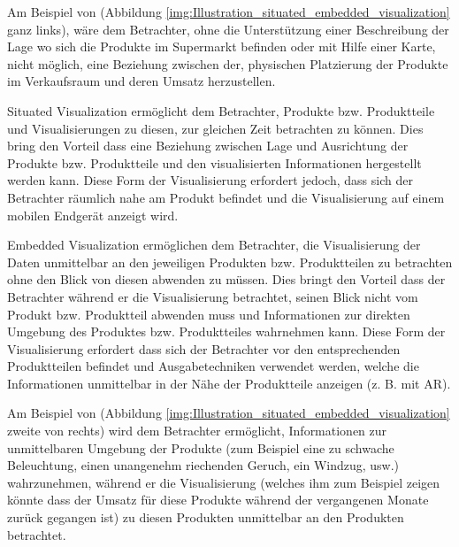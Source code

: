 Am Beispiel von (Abbildung \ref{img:Illustration_situated_embedded_visualization} ganz links), wäre dem Betrachter, ohne die Unterstützung einer Beschreibung der Lage wo sich die Produkte im 
Supermarkt befinden oder mit Hilfe einer Karte, nicht möglich, eine Beziehung zwischen der, physischen Platzierung der Produkte im Verkaufsraum und deren Umsatz herzustellen.

Situated Visualization ermöglicht dem Betrachter, Produkte bzw. Produktteile und Visualisierungen zu diesen, zur gleichen Zeit betrachten zu können. Dies bring den Vorteil dass eine Beziehung 
zwischen Lage und Ausrichtung der Produkte bzw. Produktteile und den visualisierten Informationen hergestellt werden kann. Diese Form der Visualisierung erfordert jedoch, dass sich 
der Betrachter räumlich nahe am Produkt befindet und die Visualisierung auf einem mobilen Endgerät anzeigt wird.

Embedded Visualization ermöglichen dem Betrachter, die Visualisierung der Daten unmittelbar an den jeweiligen Produkten bzw. Produktteilen zu betrachten ohne den Blick von diesen abwenden zu müssen. 
Dies bringt den Vorteil dass der Betrachter während er die Visualisierung betrachtet, seinen Blick nicht vom Produkt bzw. Produktteil abwenden muss und Informationen zur direkten Umgebung des Produktes bzw. Produktteiles wahrnehmen kann. Diese Form der Visualisierung erfordert dass sich der Betrachter vor den entsprechenden Produktteilen befindet und Ausgabetechniken verwendet werden, welche die Informationen unmittelbar in der Nähe der 
Produktteile anzeigen (z. B. mit AR).

Am Beispiel von (Abbildung \ref{img:Illustration_situated_embedded_visualization} zweite von rechts) wird dem Betrachter ermöglicht, Informationen zur unmittelbaren Umgebung der Produkte (zum Beispiel eine zu schwache Beleuchtung, einen unangenehm riechenden Geruch, ein Windzug, usw.) wahrzunehmen, während er die Visualisierung (welches ihm zum Beispiel zeigen könnte dass der Umsatz für diese Produkte während der vergangenen Monate zurück gegangen ist) zu diesen Produkten unmittelbar an den Produkten betrachtet.  

